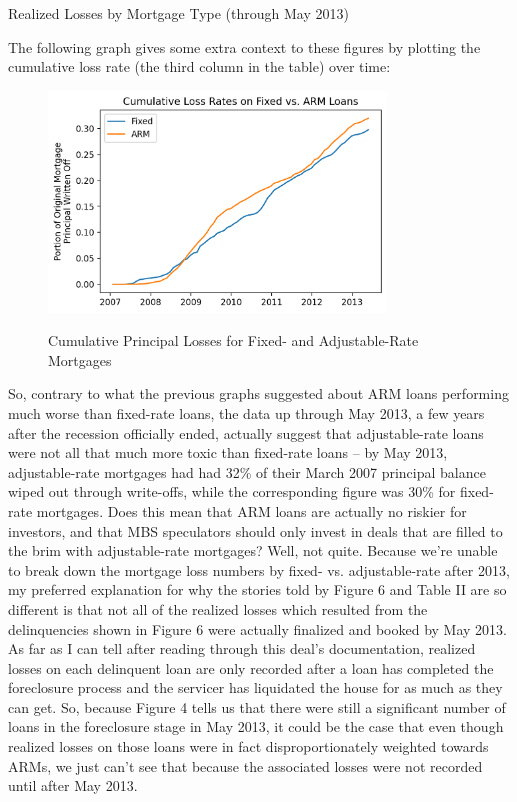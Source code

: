 \documentclass[12pt]{article}
\begin{document}
\begin{table}[h]
	\centering
	
	\caption{Realized Losses by Mortgage Type (through May 2013)}
	\label{tab:table_realized_losses_fixed_vs_arm}
\end{table}

The following graph gives some extra context to these figures by plotting the cumulative loss rate (the third column in the table) over time:

\begin{figure}[h]
	\centering
	\caption{Cumulative Principal Losses for Fixed- and Adjustable-Rate Mortgages}
	\includegraphics[width=0.8\textwidth]{../figures/timeseries_cumulative_losses_fixed_vs_arm}
	\label{fig:timeseries_cumulative_losses_fixed_vs_arm}
\end{figure}

So, contrary to what the previous graphs suggested about ARM loans performing much worse than fixed-rate loans, the data up through May 2013, a few years after the recession officially ended, actually suggest that adjustable-rate loans were not all that much more toxic than fixed-rate loans – by May 2013, adjustable-rate mortgages had had 32\% of their March 2007 principal balance wiped out through write-offs, while the corresponding figure was 30\% for fixed-rate mortgages. Does this mean that ARM loans are actually no riskier for investors, and that MBS speculators should only invest in deals that are filled to the brim with adjustable-rate mortgages? Well, not quite. Because we’re unable to break down the mortgage loss numbers by fixed- vs. adjustable-rate after 2013, my preferred explanation for why the stories told by Figure 6 and Table II are so different is that not all of the realized losses which resulted from the delinquencies shown in Figure 6 were actually finalized and booked by May 2013. As far as I can tell after reading through this deal’s documentation, realized losses on each delinquent loan are only recorded after a loan has completed the foreclosure process and the servicer has liquidated the house for as much as they can get. So, because Figure 4 tells us that there were still a significant number of loans in the foreclosure stage in May 2013, it could be the case that even though realized losses on those loans were in fact disproportionately weighted towards ARMs, we just can’t see that because the associated losses were not recorded until after May 2013.
\end{document}
